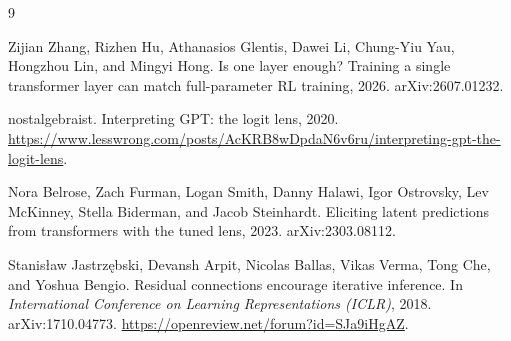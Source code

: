\documentclass[11pt]{article}
\begin{document}
\begin{thebibliography}{9}

Zijian Zhang, Rizhen Hu, Athanasios Glentis, Dawei Li, Chung-Yiu Yau, Hongzhou Lin, and Mingyi Hong.
\newblock Is one layer enough? Training a single transformer layer can match full-parameter RL training, 2026.
\newblock arXiv:2607.01232.

nostalgebraist.
\newblock Interpreting GPT: the logit lens, 2020.
\newblock \url{https://www.lesswrong.com/posts/AcKRB8wDpdaN6v6ru/interpreting-gpt-the-logit-lens}.

Nora Belrose, Zach Furman, Logan Smith, Danny Halawi, Igor Ostrovsky, Lev McKinney, Stella Biderman, and Jacob Steinhardt.
\newblock Eliciting latent predictions from transformers with the tuned lens, 2023.
\newblock arXiv:2303.08112.

Stanis{\l}aw Jastrz{\k{e}}bski, Devansh Arpit, Nicolas Ballas, Vikas Verma, Tong Che, and Yoshua Bengio.
\newblock Residual connections encourage iterative inference.
\newblock In \emph{International Conference on Learning Representations (ICLR)}, 2018.
\newblock arXiv:1710.04773. \url{https://openreview.net/forum?id=SJa9iHgAZ}.

\end{thebibliography}
\end{document}
